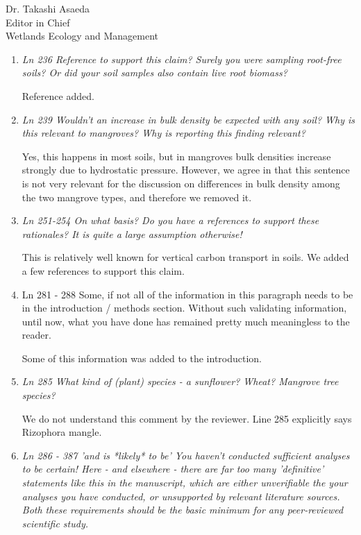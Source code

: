 \documentclass[11pt]{bgcletter}
\begin{document}
\begin{letter}{Dr. Takashi Asaeda\\
 Editor in Chief \\ Wetlands Ecology and Management}
\begin{enumerate}
{\color{blue} We reworded this paragraph. The point is simply that the results helped us to make an interpretation of the origin of the carbon, but this is analyzed only in the discussion, independent of the results section where se state the result without interpret them. }

\item {\it Ln 236 Reference to support this claim? Surely you were sampling root-free soils? Or did your soil samples also contain live root biomass?}

{\color{blue} Reference added. }

\item {\it Ln 239 Wouldn't an increase in bulk density be expected with any soil? Why is this relevant to mangroves? Why is reporting this finding relevant?}

{\color{blue} Yes, this happens in most soils, but in mangroves bulk densities increase strongly due to hydrostatic pressure. However, we agree in that this sentence is not very relevant for the discussion on differences in bulk density among the two mangrove types, and therefore we removed it.}

\item {\it Ln 251-254 On what basis? Do you have a references to support these rationales? It is quite a large assumption otherwise!}

{\color{blue} This is relatively well known for vertical carbon transport in soils. We added a few references to support this claim. }

\item Ln 281 - 288 Some, if not all of the information in this paragraph needs to be in the introduction / methods section. Without such validating information, until now, what you have done has remained pretty much meaningless to the reader.

{\color{blue} Some of this information was added to the introduction.}

\item {\it Ln 285 What kind of (plant) species - a sunflower? Wheat? Mangrove tree species?}

{\color{blue} We do not understand this comment by the reviewer. Line 285 explicitly says Rizophora mangle.}

\item {\it Ln 286 - 387 'and is *likely* to be' 
You haven't conducted sufficient analyses to be certain!
Here - and elsewhere - there are far too many 'definitive' statements like this in the manuscript, which are either unverifiable the your analyses you have conducted, or unsupported by relevant literature sources. Both these requirements should be the basic minimum for any peer-reviewed scientific study.}


\end{enumerate}
\end{letter}
\end{document}

